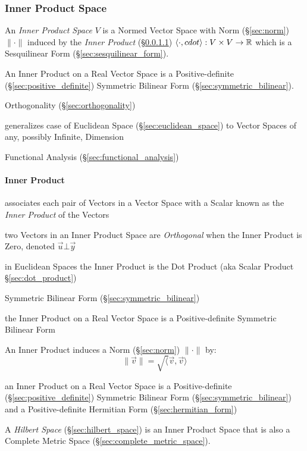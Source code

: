 \subsubsection{Inner Product Space}\label{sec:innerproduct_space}

An \emph{Inner Product Space} $V$ is a Normed Vector Space with Norm
(\S\ref{sec:norm}) $\|\cdot\|$ induced by the \emph{Inner Product}
(\S\ref{sec:inner_product}) $\langle{\cdot,cdot}\rangle : V \times V
\rightarrow \mathbb{R}$ which is a Sesquilinear Form
(\S\ref{sec:sesquilinear_form}).

An Inner Product on a Real Vector Space is a Positive-definite
(\S\ref{sec:positive_definite}) Symmetric Bilinear Form
(\S\ref{sec:symmetric_bilinear}).

\fist Orthogonality (\S\ref{sec:orthogonality})

generalizes case of Euclidean Space (\S\ref{sec:euclidean_space}) to
Vector Spaces of any, possibly Infinite, Dimension

Functional Analysis (\S\ref{sec:functional_analysis})



\paragraph{Inner Product}\label{sec:inner_product}\hfill

associates each pair of Vectors in a Vector Space with a Scalar known
as the \emph{Inner Product} of the Vectors

two Vectors in an Inner Product Space are \emph{Orthogonal} when the Inner
Product is Zero, denoted $\vec{u} \bot \vec{y}$

in Euclidean Spaces the Inner Product is the Dot Product (aka Scalar Product
\S\ref{sec:dot_product})

Symmetric Bilinear Form (\S\ref{sec:symmetric_bilinear})

the Inner Product on a Real Vector Space is a Positive-definite Symmetric
Bilinear Form

An Inner Product induces a Norm (\S\ref{sec:norm}) $\|\cdot\|$ by:
\[
  \|\vec{v}\| = \sqrt\langle{\vec{v},\vec{v}}\rangle
\]

an Inner Product on a Real Vector Space is a Positive-definite
(\S\ref{sec:positive_definite}) Symmetric Bilinear Form
(\S\ref{sec:symmetric_bilinear}) and a Positive-definite Hermitian Form
(\S\ref{sec:hermitian_form})

A \emph{Hilbert Space} (\S\ref{sec:hilbert_space}) is an Inner Product Space
that is also a Complete Metric Space (\S\ref{sec:complete_metric_space}).

